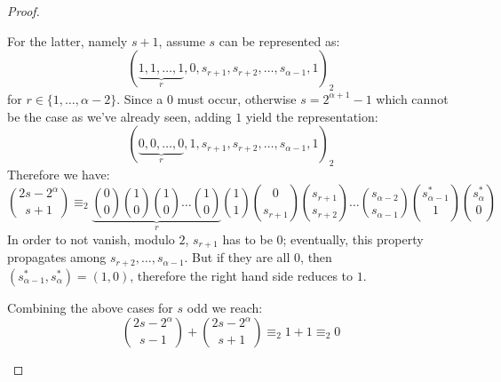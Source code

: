 \begin{proof}
\begin{itemize}
\begin{itemize}
                For the latter, namely $s+1$, assume $s$ can be represented as:
                \begin{displaymath}
                    (\underbrace{1,1,\ldots,1}_{r},0,s_{r+1},s_{r+2},\ldots,s_{{\alpha}-1},1)_{2}
                \end{displaymath}
                for $r\in\lbrace1,\ldots,{\alpha}-2\rbrace$. Since a $0$ must occur, otherwise $s=2^{{\alpha}+1}-1$
                which cannot be the case as we've already seen, adding $1$ yield the representation:
                \begin{displaymath}
                    (\underbrace{0,0,\ldots,0}_{r},1,s_{r+1},s_{r+2},\ldots,s_{{\alpha}-1},1)_{2}
                \end{displaymath}
                Therefore we have:
                \begin{displaymath}
                    {{2s-2^{{\alpha}}}\choose{s+1}}
                    \equiv_{2}
                    \underbrace{
                        {{0}\choose{0}}
                        {{1}\choose{0}}
                        {{1}\choose{0}}
                        \ldots
                        {{1}\choose{0}}
                    }_{r}
                    {{1}\choose{1}}
                    {{0}\choose{s_{r+1}}}
                    {{s_{r+1}}\choose{s_{r+2}}}
                    \ldots
                    {{s_{{\alpha}-2}}\choose{s_{{\alpha}-1}}}
                    {{s_{{\alpha}-1}^{*}}\choose{1}}
                    {{s_{{\alpha}}^{*}}\choose{0}}
                \end{displaymath}
                In order to not vanish, modulo $2$,
                $s_{r+1}$ has to be $0$; eventually, this property propagates among $s_{r+2}, \ldots, s_{{\alpha}-1}$.
                But if they are all $0$, %
                then $(s_{{\alpha}-1}^{*},s_{{\alpha}}^{*})=(1,0)$, therefore the right hand side reduces to $1$.

                Combining the above cases for $s$ odd we reach:
                \begin{displaymath}
                        {{2s-2^{{\alpha}}}\choose{s-1}}+{{2s-2^{{\alpha}}}\choose{s+1}} \equiv_{2} 1+1\equiv_{2} 0
                \end{displaymath}
        \end{itemize}


\end{itemize}
\end{proof}
